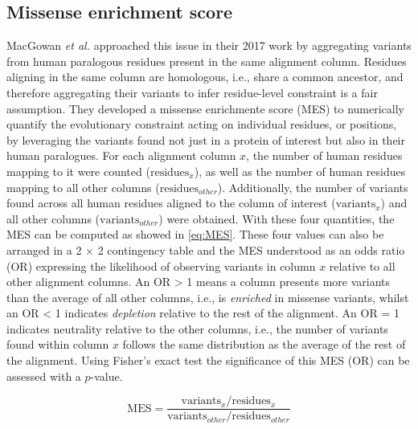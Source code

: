 \subsection{Missense enrichment score}

MacGowan \textit{et al.} approached this issue in their 2017 work \cite{MACGOWAN_2017_VARIANTS} by aggregating variants from human paralogous residues present in the same alignment column. Residues aligning in the same column are homologous, i.e., share a common ancestor, and therefore aggregating their variants to infer residue-level constraint is a fair assumption. They developed a missense enrichmente score (MES) to numerically quantify the evolutionary constraint acting on individual residues, or positions, by leveraging the variants found not just in a protein of interest but also in their human paralogues. For each alignment column $x$, the number of human residues mapping to it were counted ($\text{residues}_x$), as well as the number of human residues mapping to all other columns ($\text{residues}_{other}$). Additionally, the number of variants found across all human residues aligned to the column of interest ($\text{variants}_x$) and all other columns ($\text{variants}_{other}$) were obtained. With these four quantities, the MES can be computed as showed in \autoref{eq:MES}. These four values can also be arranged in a 2 $\times$ 2 contingency table and the MES understood as an odds ratio (OR) expressing the likelihood of observing variants in column $x$ relative to all other alignment columns. An OR > 1 means a column presents more variants than the average of all other columns, i.e., is \textit{enriched} in missense variants, whilst an OR < 1 indicates \textit{depletion} relative to the rest of the alignment. An OR = 1 indicates neutrality relative to the other columns, i.e., the number of variants found within column $x$ follows the same distribution as the average of the rest of the alignment. Using Fisher's exact test \cite{FISHER_1935_TEST} the significance of this MES (OR) can be assessed with a $p$-value.

\begin{equation}
\text{MES} = \frac{\text{variants}_x / \text{residues}_x}{\text{variants}_{other} /\text{residues}_{other}}
\label{eq:MES}
\end{equation}

\vspace{-13pt} %
\vspace{-13pt} %

